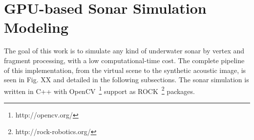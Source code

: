 \documentclass[final,5p,times]{elsarticle}
\begin{document}
%
%
%
%


\section{GPU-based Sonar Simulation Modeling}
\label{dev}

The goal of this work is to simulate any kind of underwater sonar by vertex and fragment processing, with a low computational-time cost. The complete pipeline of this implementation, from the virtual scene to the synthetic acoustic image, is seen in Fig. XX and detailed in the following subsections. The sonar simulation is written in C++ with OpenCV~\footnote{http://opencv.org/} support as ROCK~\footnote{http://rock-robotics.org/} packages.
\end{document}

